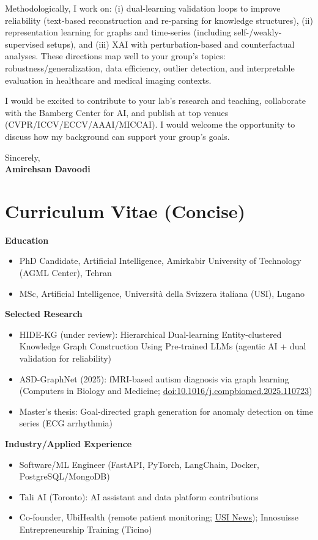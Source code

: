 \documentclass[11pt]{article}
\begin{document}
Methodologically, I work on: (i) dual-learning validation loops to improve reliability (text-based reconstruction and re-parsing for knowledge structures), (ii) representation learning for graphs and time-series (including self-/weakly-supervised setups), and (iii) XAI with perturbation-based and counterfactual analyses. These directions map well to your group’s topics: robustness/generalization, data efficiency, outlier detection, and interpretable evaluation in healthcare and medical imaging contexts.

I would be excited to contribute to your lab’s research and teaching, collaborate with the Bamberg Center for AI, and publish at top venues (CVPR/ICCV/ECCV/AAAI/MICCAI). I would welcome the opportunity to discuss how my background can support your group’s goals.

Sincerely,\\[6pt]
\textbf{Amirehsan Davoodi}

\vspace{0.6cm}

\section*{Curriculum Vitae (Concise)}
\textbf{Education}
\begin{itemize}[leftmargin=*]
    \item PhD Candidate, Artificial Intelligence, Amirkabir University of Technology (AGML Center), Tehran
    \item MSc, Artificial Intelligence, Universit\`a della Svizzera italiana (USI), Lugano
\end{itemize}

\textbf{Selected Research}
\begin{itemize}[leftmargin=*]
    \item HIDE-KG (under review): Hierarchical Dual-learning Entity-clustered Knowledge Graph Construction Using Pre-trained LLMs (agentic AI + dual validation for reliability)
    \item ASD-GraphNet (2025): fMRI-based autism diagnosis via graph learning (Computers in Biology and Medicine; \href{https://doi.org/10.1016/j.compbiomed.2025.110723}{doi:10.1016/j.compbiomed.2025.110723})
    \item Master’s thesis: Goal-directed graph generation for anomaly detection on time series (ECG arrhythmia)
\end{itemize}

\textbf{Industry/Applied Experience}
\begin{itemize}[leftmargin=*]
    \item Software/ML Engineer (FastAPI, PyTorch, LangChain, Docker, PostgreSQL/MongoDB)
    \item Tali AI (Toronto): AI assistant and data platform contributions
    \item Co-founder, UbiHealth (remote patient monitoring; \href{https://www.usi.ch/en/feeds/8176}{USI News}); Innosuisse Entrepreneurship Training (Ticino)
\end{itemize}
\end{document}
